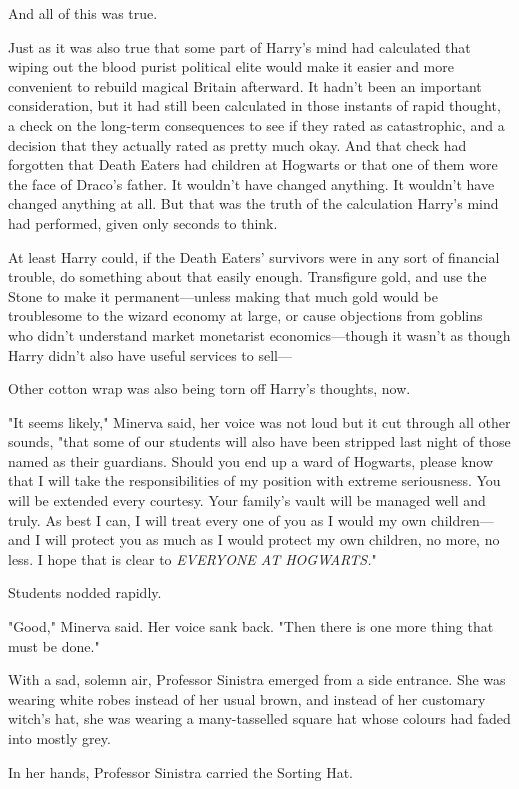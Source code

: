 And all of this was true.

Just as it was also true that some part of Harry’s mind had calculated that
wiping out the blood purist political elite would make it easier and more
convenient to rebuild magical Britain afterward. It hadn’t been an important
consideration, but it had still been calculated in those instants of rapid
thought, a check on the long-term consequences to see if they rated as
catastrophic, and a decision that they actually rated as pretty much okay. And
that check had forgotten that Death Eaters had children at Hogwarts or that one
of them wore the face of Draco’s father. It wouldn’t have changed anything. It
wouldn’t have changed anything at all. But that was the truth of the
calculation Harry’s mind had performed, given only seconds to think.

At least Harry could, if the Death Eaters’ survivors were in any sort of
financial trouble, do something about that easily enough. Transfigure gold, and
use the Stone to make it permanent—unless making that much gold would be
troublesome to the wizard economy at large, or cause objections from goblins
who didn’t understand market monetarist economics—though it wasn’t as though
Harry didn’t also have useful services to sell—

Other cotton wrap was also being torn off Harry’s thoughts, now.

"It seems likely," Minerva said, her voice was not loud but it cut through all
other sounds, "that some of our students will also have been stripped last
night of those named as their guardians. Should you end up a ward of Hogwarts,
please know that I will take the responsibilities of my position with extreme
seriousness. You will be extended every courtesy. Your family’s vault will be
managed well and truly. As best I can, I will treat every one of you as I would
my own children—and I will protect you as much as I would protect my own
children, no more, no less. I hope that is clear to \emph{EVERYONE AT
HOGWARTS.}"

Students nodded rapidly.

"Good," Minerva said. Her voice sank back. "Then there is one more thing that
must be done."

With a sad, solemn air, Professor Sinistra emerged from a side entrance. She
was wearing white robes instead of her usual brown, and instead of her
customary witch’s hat, she was wearing a many-tasselled square hat whose colours
had faded into mostly grey.

In her hands, Professor Sinistra carried the Sorting Hat.


